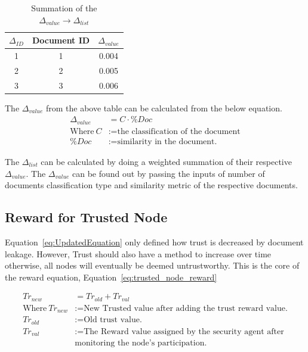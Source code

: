 \begin{table}[h!]
    \centering
    \begin{tabular}{c | c | c}
        \hline
        \(\Delta_{ID} \) & Document ID & \(\Delta_{value}\) \\
        \hline \hline
        1 & 1 & 0.004 \\
        2 & 2 & 0.005 \\
        3 & 3 & 0.006 \\
    \end{tabular}
    \caption{Summation of the \(\Delta_{value} \to \Delta_{list}\)}
    \label{tab:summation_value_calculation}
\end{table}

The \(\Delta_{value}\) from the above table can be calculated from the below equation.
\begin{equation}
    \begin{aligned}
    \Delta_{value} &= C \cdot \%Doc \\
    \text{Where}~C &:= \text{the classification of the document} \\
    \%Doc &:= \text{similarity in the document.}
\end{aligned}
\end{equation}

The \( \Delta_{list} \) can be calculated by doing a weighted summation of
their respective \( \Delta_{value} \). The \( \Delta_{value} \) can be found
out by passing the inputs of number of documents classification type and
similarity metric of the respective documents.

\subsection{Reward for Trusted Node}
Equation~\ref{eq:UpdatedEquation} only defined how trust is decreased by
document leakage. However, Trust should also have a method to increase over time
otherwise, all nodes will eventually be deemed untrustworthy. This is the core
of the reward equation, Equation~\ref{eq:trusted_node_reward}

\begin{equation}
    \label{eq:trusted_node_reward}
    \begin{aligned}
    Tr_{new} &= Tr_{old} + Tr_{val} \\
    \text{Where}~Tr_{new} &:= \text{New Trusted value after adding the trust reward value.} \\
    Tr_{old} &:= \text{Old trust value.} \\
    Tr_{val} &:= \text{The Reward value assigned by the security agent after}\\
                 &\text{monitoring the node's participation.}
\end{aligned}
\end{equation}

